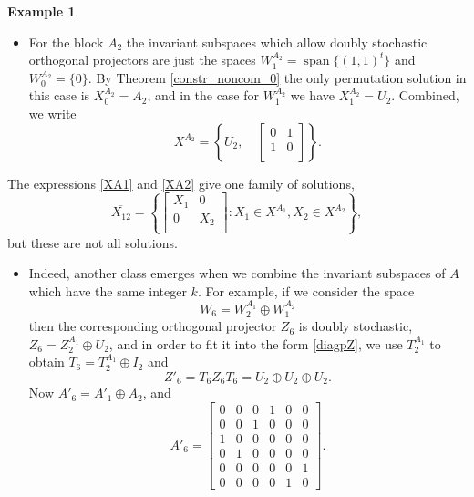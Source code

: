 \documentclass{article}
\theoremstyle{definition}\newtheorem{example}{Example}[section]
\newcommand{\mat}[4]{\left[\begin{array}{cc}#1 & #2 \\ #3 & #4 \\
	\end{array}\right]}
\begin{document}
\begin{example}
\begin{itemize}
\begin{equation}
\label{XA1}
X^{A_1}=\left\{U_4, \ P_4, \ \left[\begin{array}{cccc}
	0 & 1/2 & 0 & 1/2\\1/2 & 0 & 1/2 & 0\\ 0 & 1/2 & 0 & 1/2\\1/2 & 0 & 1/2 & 0			\end{array}\right]: P_4\in\Omega_4.\right\}.
\end{equation}
		\ \\\
		\ \\
\item For the block $A_2$ the invariant subspaces which allow doubly stochastic orthogonal projectors are just the spaces $W^{A_2}_1=\operatorname{span}\{(1,1)^t\}$ and $W^{A_2}_0=\{0\}$. By Theorem \ref{constr_noncom_0} the only permutation solution in this case is $X^{A_2}_0=A_2$, and in the case for $W^{A_2}_1$ we have $X^{A_2}_1=U_2$.
Combined, we write
\begin{equation}\label{XA2}
 		X^{A_{2}}=\left\{U_2,\quad \mat{0}{1}{1}{0}\right\}.
 		\end{equation}
 		\end{itemize}
 		The expressions \eqref{XA1} and \eqref{XA2} give one family of solutions,
 		\begin{equation}\label{X12}
 		\overline{X_{12}}=\left\{\mat{X_1}{0}{0}{X_2}: X_1\in X^{A_1}, X_2\in X^{A_2}\right\},\end{equation}
 		but these are not all solutions. 
 		\begin{itemize}
 			\item Indeed, another class emerges when we combine the invariant subspaces of $A$ which have the same integer $k$. For example, if we consider the space
 		$$W_6=W^{A_1}_2\oplus W^{A_2}_1$$
 		then the corresponding orthogonal projector $Z_6$ is doubly stochastic, $Z_6=Z^{A_1}_2\oplus U_2$, and in order to fit it into the form \eqref{diagpZ}, we use $T^{A_1}_{2}$ to obtain $T_6=T^{A_1}_2\oplus I_2$ and
 		$$Z'_6=T_6Z_6T_6=U_2\oplus U_2\oplus U_2.$$ Now $A'_6=A'_1\oplus A_2$, and 
 		$$A'_6=\left[\begin{array}{cccccc}
 			0 & 0 & 0 & 1 & 0 & 0\\0 & 0 & 1 & 0& 0 & 0\\ 1 & 0 & 0 & 0 &0 & 0\\0 & 1 & 0 & 0& 0 & 0\\ 0 & 0 & 0 &0 & 0 & 1\\
 			0 & 0 & 0 &0 & 1 & 0	\end{array}\right].$$

\end{itemize}
\end{example}
\end{document}
